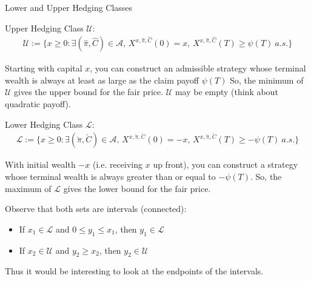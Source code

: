 \documentclass{beamer}
\begin{document}
\begin{frame}{Lower and Upper Hedging Classes}

    {\footnotesize \footnotesize
    \par Upper Hedging Class $\mathcal{U}$:
    \begin{align*}
         \mathcal{U} := \{x \geq 0 : \exists (\hat{\pi}, \hat{C}) \in \mathcal{A}, \, X^{x,\hat{\pi},\hat{C}}(0)
          = x, \, X^{x,\hat{\pi},\hat{C}}(T) \geq \psi(T) \ a.s.\}
    \end{align*}
    \par Starting with capital $x$,
     you can construct an admissible strategy whose terminal wealth is always at least as large as the claim payoff $\psi(T)$
     So, the minimum of $\mathcal{U}$ gives the upper bound for the fair price. $\mathcal{U}$ may be empty (think about quadratic payoff).
     \vspace{1em}
     \par  \pause Lower Hedging Class $\mathcal{L}$:
     \begin{align*}
         \mathcal{L} := \{x \geq 0 : \exists (\check{\pi}, \check{C}) \in \mathcal{A}, \, X^{x,\check{\pi},\check{C}}(0) 
         = -x, \, X^{x,\check{\pi},\check{C}}(T) \geq -\psi(T) \ a.s.\}
     \end{align*}
     \par  With initial wealth $-x$ (i.e. receiving $x$ up front),
      you can construct a strategy whose terminal wealth is always greater than or equal to $-\psi(T)$. 
      So, the maximum of $\mathcal{L}$ gives the lower bound for the fair price.
      \vspace{1em}
      \par  \pause Observe that both sets are intervals (connected):
     \begin{itemize}
        \item If $x_1 \in \mathcal{L}$ and $0 \leq y_1 \leq x_1$, then $y_1 \in \mathcal{L}$
        \item If $x_2 \in \mathcal{U}$ and $y_2 \geq x_2$, then $y_2 \in \mathcal{U}$
    \end{itemize}
    \par Thus it would be interesting to look at the endpoints of the intervals.
    }
\end{frame} 
\end{document}
